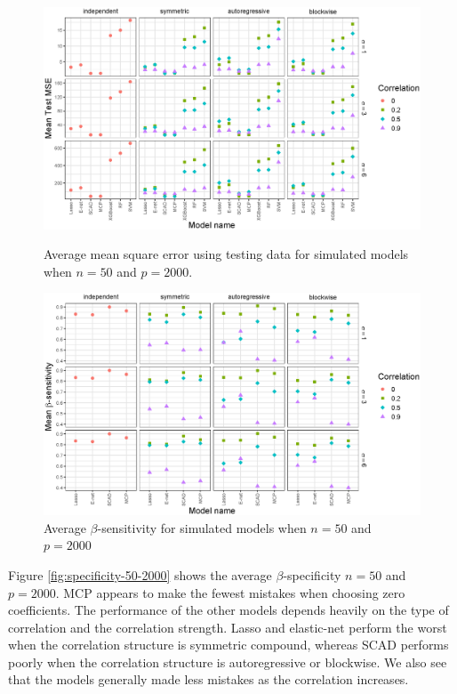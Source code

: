 \documentclass{article}
\begin{document}
\begin{figure}[t!]
	\centering
	\includegraphics[width = \textwidth]{images/facet-test-mse/facet_test_mse_50_2000.eps}
	\captionsetup{width = 0.8\textwidth}
	\caption{Average mean square error using testing data for simulated models when $n = 50$ and $p = 2000$.}
	\label{fig:test-mse-50-2000}
	
	\bigskip
	
	\includegraphics[width = \textwidth]{images/facet-sensitivity/facet_sensitivity_50_2000.eps}
	\captionsetup{width = 0.8\textwidth}
	\caption{Average $\beta$-sensitivity for simulated models when $n = 50$ and $p = 2000$}
	\label{fig:sensitivity-50-2000}
\end{figure}

Figure \ref{fig:specificity-50-2000} shows the average $\beta$-specificity $n = 50$ and $p = 2000$. MCP appears to make the fewest mistakes when choosing zero coefficients. The performance of the other models depends heavily on the type of correlation and the correlation strength. Lasso and elastic-net perform the worst when the correlation structure is symmetric compound, whereas SCAD performs poorly when the correlation structure is autoregressive or blockwise. We also see that the models generally made less mistakes as the correlation increases.
\end{document}
